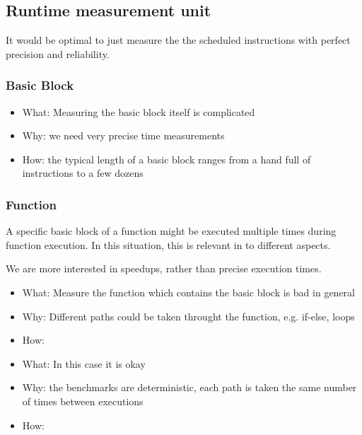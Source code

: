 \subsection{Runtime measurement unit}
It would be optimal to just measure the the scheduled instructions with perfect precision and reliability.
\subsubsection{Basic Block}
\begin{itemize}
    \item What: Measuring the basic block itself is complicated
    \item Why: we need very precise time measurements
    \item How: the typical length of a basic block ranges from a hand full of instructions to a few dozens
\end{itemize}
\subsubsection{Function}
\label{sec:approach:datageneration:runtime:function}
A specific basic block of a function might be executed multiple times during function execution.
In this situation, this is relevant in to different aspects.

We are more interested in speedups, rather than precise execution times.


\begin{itemize}
    \item What: Measure the function which contains the basic block is bad in general
    \item Why: Different paths could be taken throught the function, e.g. if-else, loops
    \item How: 
\end{itemize}
\begin{itemize}
    \item What: In this case it is okay
    \item Why: the benchmarks are deterministic, each path is taken the same number of times between executions
    \item How: 
\end{itemize}
